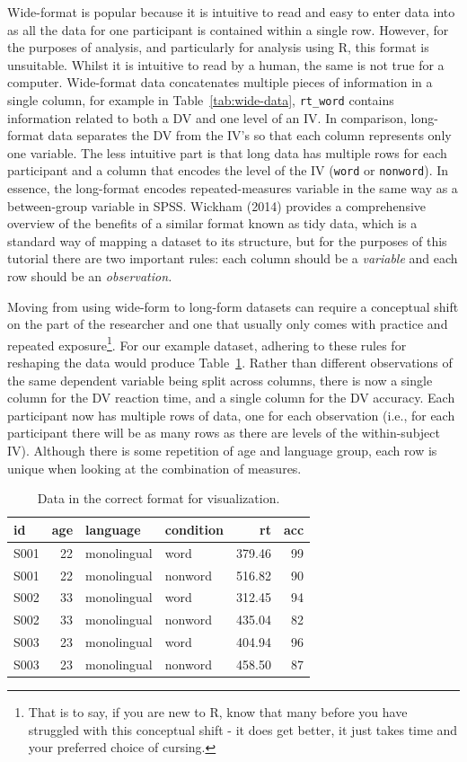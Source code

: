 \documentclass[
  english,
  doc,floatsintext]{apa6}
\begin{document}
Wide-format is popular because it is intuitive to read and easy to enter data into as all the data for one participant is contained within a single row. However, for the purposes of analysis, and particularly for analysis using R, this format is unsuitable. Whilst it is intuitive to read by a human, the same is not true for a computer. Wide-format data concatenates multiple pieces of information in a single column, for example in Table~\ref{tab:wide-data}, \texttt{rt\_word} contains information related to both a DV and one level of an IV. In comparison, long-format data separates the DV from the IV's so that each column represents only one variable. The less intuitive part is that long data has multiple rows for each participant and a column that encodes the level of the IV (\texttt{word} or \texttt{nonword}). In essence, the long-format encodes repeated-measures variable in the same way as a between-group variable in SPSS. Wickham (2014) provides a comprehensive overview of the benefits of a similar format known as tidy data, which is a standard way of mapping a dataset to its structure, but for the purposes of this tutorial there are two important rules: each column should be a \emph{variable} and each row should be an \emph{observation.}

Moving from using wide-form to long-form datasets can require a conceptual shift on the part of the researcher and one that usually only comes with practice and repeated exposure\footnote{That is to say, if you are new to R, know that many before you have struggled with this conceptual shift - it does get better, it just takes time and your preferred choice of cursing.}. For our example dataset, adhering to these rules for reshaping the data would produce Table~\ref{tab:long}. Rather than different observations of the same dependent variable being split across columns, there is now a single column for the DV reaction time, and a single column for the DV accuracy. Each participant now has multiple rows of data, one for each observation (i.e., for each participant there will be as many rows as there are levels of the within-subject IV). Although there is some repetition of age and language group, each row is unique when looking at the combination of measures.

\begin{table}

\caption{\label{tab:long}Data in the correct format for visualization.}
\centering
\begin{tabular}[t]{l|r|l|l|r|r}
\hline
id & age & language & condition & rt & acc\\
\hline
S001 & 22 & monolingual & word & 379.46 & 99\\
\hline
S001 & 22 & monolingual & nonword & 516.82 & 90\\
\hline
S002 & 33 & monolingual & word & 312.45 & 94\\
\hline
S002 & 33 & monolingual & nonword & 435.04 & 82\\
\hline
S003 & 23 & monolingual & word & 404.94 & 96\\
\hline
S003 & 23 & monolingual & nonword & 458.50 & 87\\
\hline
\end{tabular}
\end{table}
\end{document}
